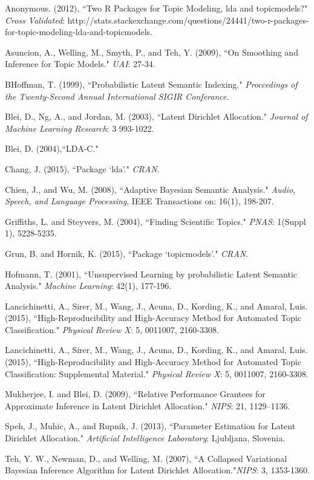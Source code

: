 \documentclass[12pt]{article}
\begin{document}
\newpage
\begin{thebibliography}{4}
		
	Anonymous. (2012),
	``Two R Packages for Topic Modeling, lda and topicmodels?" \textit{Cross Validated}: http://stats.stackexchange.com/questions/24441/two-r-packages-for-topic-modeling-lda-and-topicmodels.
	
	Asuncion, A., Welling, M., Smyth, P., and Teh, Y.  (2009),
	``On Smoothing and Inference for Topic Models." 
	\textit{UAI}: 27-34.
	
	BHoffman, T.  (1999),
	``Probabilistic Latent Semantic Indexing."
	\textit{Proccedings of the Twenty-Second Annual International SIGIR Conferance}.
		
	Blei, D., Ng, A., and Jordan, M.  (2003),
	``Latent Dirichlet Allocation."
	\textit{Journal of Machine Learning Research}: 3 993-1022.
	
	Blei, D. (2004),``LDA-C."
		
	Chang, J.  (2015),
	``Package `lda'."
	\textit{CRAN}.

	Chien, J., and Wu, M.  (2008),
	``Adaptive Bayesian Semantic Analysis."
	\textit{Audio, Speech, and Language Processing}, IEEE Transactions on: 16(1), 198-207.

	Griffiths, L. and Steyvers, M.  (2004),
	``Finding Scientific Topics."
	\textit{PNAS}: 1(Suppl 1), 5228-5235.

	Grun, B. and Hornik, K.  (2015),
	``Package `topicmodels'."
	\textit{CRAN}.
	
	Hofmann, T.  (2001),
	``Unsupervised Learning by probabilistic Latent Semantic Analysis."
	\textit{Machine Learning}: 42(1), 177-196.
	
	Lancichinetti, A., Sirer, M., Wang, J., Acuna, D., Kording, K., and Amaral, Luis. (2015),
	``High-Reproducibility and High-Accuracy Method for Automated Topic Classification."
	\textit{Physical Review X}: 5, 0011007, 2160-3308.
	
	Lancichinetti, A., Sirer, M., Wang, J., Acuna, D., Kording, K., and Amaral, Luis. (2015),
	``High-Reproducibility and High-Accuracy Method for Automated Topic Classification: Supplemental Material."
	\textit{Physical Review X}: 5, 0011007, 2160-3308.
	
	Mukherjee, I. and Blei, D.  (2009),
	``Relative Performance Grantees for Approximate Inference in Latent Dirichlet Allocation." 
	\textit{NIPS}: 21, 1129–1136.
	
	Speh, J., Muhic, A., and Rupnik, J.  (2013),
	``Parameter Estimation for Latent Dirichlet Allocation." \textit{Artificial Intelligence Laboratory}: Ljubljana, Slovenia.
		
	Teh, Y. W., Newman, D., and Welling, M.  (2007),
	``A Collapsed Variational Bayesian Inference Algorithm for Latent Dirichlet 
	Allocation."\textit{NIPS}: 3, 1353-1360.
	
\end{thebibliography}
\end{document}
